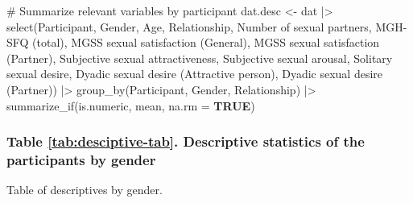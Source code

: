 \documentclass[
  bookmarksnumbered]{article}
\newenvironment{Shaded}{\begin{snugshade}}{\end{snugshade}}
\newcommand{\AttributeTok}[1]{\textcolor[rgb]{0.80,0.80,0.80}{#1}}
\newcommand{\CommentTok}[1]{\textcolor[rgb]{0.50,0.62,0.50}{#1}}
\newcommand{\ConstantTok}[1]{\textcolor[rgb]{0.86,0.64,0.64}{\textbf{#1}}}
\newcommand{\FunctionTok}[1]{\textcolor[rgb]{0.94,0.94,0.56}{#1}}
\newcommand{\NormalTok}[1]{\textcolor[rgb]{0.80,0.80,0.80}{#1}}
\newcommand{\OtherTok}[1]{\textcolor[rgb]{0.94,0.94,0.56}{#1}}
\newcommand{\SpecialCharTok}[1]{\textcolor[rgb]{0.86,0.64,0.64}{#1}}
\newcommand{\StringTok}[1]{\textcolor[rgb]{0.80,0.58,0.58}{#1}}
\begin{document}
\begin{Shaded}
\begin{Highlighting}[]
\CommentTok{\# Summarize relevant variables by participant}
\NormalTok{dat.desc }\OtherTok{\textless{}{-}}\NormalTok{ dat }\SpecialCharTok{|\textgreater{}}
  \FunctionTok{select}\NormalTok{(Participant, Gender, Age, Relationship, }\StringTok{\textasciigrave{}}\AttributeTok{Number of sexual partners}\StringTok{\textasciigrave{}}\NormalTok{, }
         \StringTok{\textasciigrave{}}\AttributeTok{MGH{-}SFQ (total)}\StringTok{\textasciigrave{}}\NormalTok{, }
         \StringTok{\textasciigrave{}}\AttributeTok{MGSS sexual satisfaction (General)}\StringTok{\textasciigrave{}}\NormalTok{, }\StringTok{\textasciigrave{}}\AttributeTok{MGSS sexual satisfaction (Partner)}\StringTok{\textasciigrave{}}\NormalTok{, }
         \StringTok{\textasciigrave{}}\AttributeTok{Subjective sexual attractiveness}\StringTok{\textasciigrave{}}\NormalTok{, }\StringTok{\textasciigrave{}}\AttributeTok{Subjective sexual arousal}\StringTok{\textasciigrave{}}\NormalTok{, }
         \StringTok{\textasciigrave{}}\AttributeTok{Solitary sexual desire}\StringTok{\textasciigrave{}}\NormalTok{, }
         \StringTok{\textasciigrave{}}\AttributeTok{Dyadic sexual desire (Attractive person)}\StringTok{\textasciigrave{}}\NormalTok{, }\StringTok{\textasciigrave{}}\AttributeTok{Dyadic sexual desire (Partner)}\StringTok{\textasciigrave{}}\NormalTok{) }\SpecialCharTok{|\textgreater{}}
  \FunctionTok{group\_by}\NormalTok{(Participant, Gender, Relationship) }\SpecialCharTok{|\textgreater{}}
  \FunctionTok{summarize\_if}\NormalTok{(is.numeric, mean, }\AttributeTok{na.rm =} \ConstantTok{TRUE}\NormalTok{)}
\end{Highlighting}
\end{Shaded}

\subsubsection{Table \ref{tab:desciptive-tab}. Descriptive statistics of the participants by gender}\label{table-reftabdesciptive-tab.-descriptive-statistics-of-the-participants-by-gender}

Table of descriptives by gender.
\end{document}
